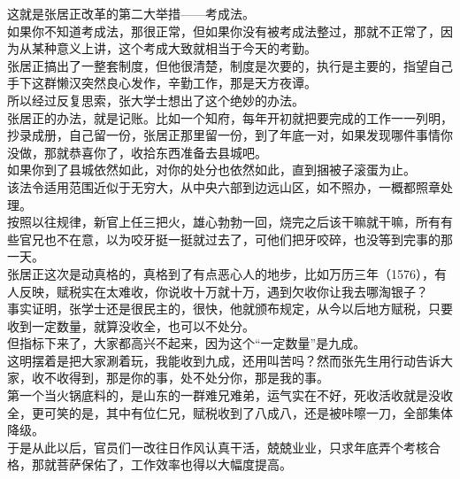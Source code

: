 \begin{multicols}{\theparacolNo}
这就是张居正改革的第二大举措——考成法。\\

如果你不知道考成法，那很正常，但如果你没有被考成法整过，那就不正常了，因为从某种意义上讲，这个考成大致就相当于今天的考勤。\\

张居正搞出了一整套制度，但他很清楚，制度是次要的，执行是主要的，指望自己手下这群懒汉突然良心发作，辛勤工作，那是天方夜谭。\\

所以经过反复思索，张大学士想出了这个绝妙的办法。\\

张居正的办法，就是记账。比如一个知府，每年开初就把要完成的工作一一列明，抄录成册，自己留一份，张居正那里留一份，到了年底一对，如果发现哪件事情你没做，那就恭喜你了，收拾东西准备去县城吧。\\

如果你到了县城依然如此，对你的处分也依然如此，直到捆被子滚蛋为止。\\

该法令适用范围近似于无穷大，从中央六部到边远山区，如不照办，一概都照章处理。\\

按照以往规律，新官上任三把火，雄心勃勃一回，烧完之后该干嘛就干嘛，所有有些官兄也不在意，以为咬牙挺一挺就过去了，可他们把牙咬碎，也没等到完事的那一天。\\

张居正这次是动真格的，真格到了有点恶心人的地步，比如万历三年（1576），有人反映，赋税实在太难收，你说收十万就十万，遇到欠收你让我去哪淘银子？\\

事实证明，张学士还是很民主的，很快，他就颁布规定，从今以后地方赋税，只要收到一定数量，就算没收全，也可以不处分。\\

但指标下来了，大家都高兴不起来，因为这个“一定数量”是九成。\\

这明摆着是把大家涮着玩，我能收到九成，还用叫苦吗？然而张先生用行动告诉大家，收不收得到，那是你的事，处不处分你，那是我的事。\\

第一个当火锅底料的，是山东的一群难兄难弟，运气实在不好，死收活收就是没收全，更可笑的是，其中有位仁兄，赋税收到了八成八，还是被咔嚓一刀，全部集体降级。\\

于是从此以后，官员们一改往日作风认真干活，兢兢业业，只求年底弄个考核合格，那就菩萨保佑了，工作效率也得以大幅度提高。\\


\end{multicols}

